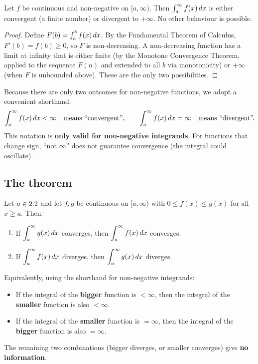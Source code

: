 \begin{proposition}
\label{thm:12-2}
Let $f$ be continuous and non-negative on $[a,\infty)$.  Then $\int_{a}^{\infty}f(x)\,dx$ is either convergent (a finite number) or divergent to $+\infty$.  No other behaviour is possible.
\end{proposition}

\begin{proof}
Define $F(b)=\int_{a}^{b}f(x)\,dx$.  By the Fundamental Theorem of Calculus, $F'(b)=f(b)\ge 0$, so $F$ is non-decreasing.  A non-decreasing function has a limit at infinity that is either finite (by the Monotone Convergence Theorem, applied to the sequence $F(n)$ and extended to all $b$ via monotonicity) or $+\infty$ (when $F$ is unbounded above).  These are the only two possibilities.
\end{proof}

\begin{remark}
Because there are only two outcomes for non-negative functions, we adopt a convenient shorthand:
\[
  \int_{a}^{\infty}f(x)\,dx < \infty
  \quad\text{means ``convergent'',}
  \qquad
  \int_{a}^{\infty}f(x)\,dx = \infty
  \quad\text{means ``divergent''.}
\]
This notation is \textbf{only valid for non-negative integrands}.  For functions that change sign, ``not $\infty$'' does not guarantee convergence (the integral could oscillate).
\end{remark}

\subsection*{The theorem}

\begin{theorem}
\label{thm:12-3}
Let $a\in2.2$ and let $f,g$ be continuous on $[a,\infty)$ with $0\le f(x)\le g(x)$ for all $x\ge a$.  Then:
\begin{enumerate}
  \item If $\displaystyle\int_{a}^{\infty}g(x)\,dx$ converges, then $\displaystyle\int_{a}^{\infty}f(x)\,dx$ converges.
  \item If $\displaystyle\int_{a}^{\infty}f(x)\,dx$ diverges, then $\displaystyle\int_{a}^{\infty}g(x)\,dx$ diverges.
\end{enumerate}
\end{theorem}

\begin{remark}
Equivalently, using the shorthand for non-negative integrands:
\begin{itemize}
  \item If the integral of the \textbf{bigger} function is $<\infty$, then the integral of the \textbf{smaller} function is also $<\infty$.
  \item If the integral of the \textbf{smaller} function is $=\infty$, then the integral of the \textbf{bigger} function is also $=\infty$.
\end{itemize}
The remaining two combinations (bigger diverges, or smaller converges) give \textbf{no information}.
\end{remark}

